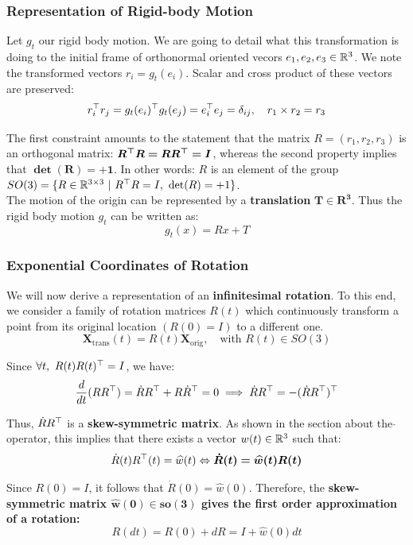 \subsubsection{Representation of Rigid-body Motion}%
\label{ssub:representation_of_rigid_body_motion}

Let $g_t$ our rigid body motion. We are going to detail what this transformation
is doing to the initial frame of orthonormal oriented vecors
$e_1, e_2, e_3 \in \mathbb{R}^3$.
We note the transformed vectors $r_i = g_t(e_i)$.
Scalar and cross product of these vectors are preserved:
	\[r_i^{\top}r_j = g_t(e_i)^{\top}g_t(e_j) = e_i^{\top}e_j = \delta_{ij}, \quad
	r_1 \times r_2 = r_3\]

The first constraint amounts to the statement that the matrix
$R = (r_1, r_2, r_3)$ is an orthogonal matrix: $\bm{R^{\top}R=RR^{\top}=I}$,
whereas the second property implies that $\bm{\det(R) = +1}$.
In other words: $R$ is an element of the group
$SO(3) = \{R \in \mathbb{R}^{3 \times{} 3}\ |\ R^{\top}R=I,\ \det(R) = +1\}$.\\

The motion of the origin can be represented by a \textbf{translation}
$\bm{T \in R^3}$. Thus the rigid body motion $g_t$ can be written as:
	\[g_t(x) = Rx + T\]


\subsubsection{Exponential Coordinates of Rotation}%
\label{ssub:exponential_coordinates_of_rotation}

We will now derive a representation of an \textbf{infinitesimal rotation}.
To this end, we consider a family of rotation matrices $R(t)$
which continuously transform a point from its original location
$(R(0) = I)$ to a different one.
	\[\bm{X}_{\text{trans}}(t) = R(t)\bm{X}_{\text{orig}}, \quad
	\text{with } R(t) \in SO(3)\]

Since $\forall t,\ R(t)R(t)^{\top} = I$, we have:
	\[\frac{d}{dt}(RR^{\top}) = \dot{R}R^{\top} + R\dot{R}^{\top}= 0
	\implies \dot{R}R^{\top} = -( \dot{R}R^{\top} )^{\top}\]

Thus, $\dot{R}R^{\top}$ is a \textbf{skew-symmetric matrix}.
As shown in the section about the $\widehat{}$ operator, this implies that
there exists a vector $w(t) \in \mathbb{R}^3$ such that:
	\[\dot{R}(t)R^{\top}(t) = \widehat{w}(t)
	\Leftrightarrow \bm{ \dot{R}(t) = \widehat{w}(t)R(t)}\]

Since $R(0) = I$, it follows that $\dot{R}(0) = \widehat{w}(0)$.
Therefore, the \textbf{skew-symmetric matrix $\bm{\widehat{w}(0) \in so(3)}$
gives the first order approximation of a rotation:}
	\[R(dt) = R(0) + dR = I + \widehat{w}(0) dt\]


